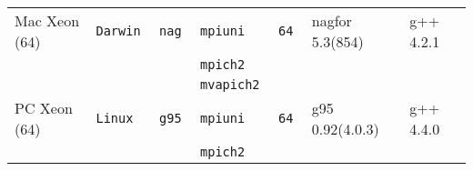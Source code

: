 \begin{longtable}{lllllll}
Mac Xeon (64)         &\tt Darwin &\tt nag          &\tt mpiuni     &\tt 64              & nagfor \footnotesize 5.3(854)       & g++ \footnotesize 4.2.1         \\ %
                      &           &                 &\tt mpich2     &                    &                                    &                                 \\
                      &           &                 &\tt mvapich2   &                    &                                    &                                 \\
PC Xeon (64)          &\tt Linux  &\tt g95          &\tt mpiuni     &\tt 64              & g95 \footnotesize 0.92(4.0.3)      & g++  \footnotesize 4.4.0        \\ %
                      &           &                 &\tt mpich2     &                    &                                    &                                 \\

\end{longtable}
